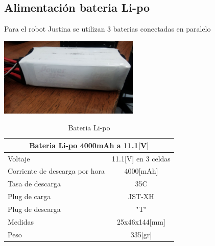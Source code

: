 \documentclass[a4paper,usenames,dvipsnames,svgnames,table]{book}
\begin{document}
\subsection{Alimentación bateria Li-po}

Para el robot Justina se utilizan 3 baterias conectadas en paralelo

\begin{center}
\includegraphics[width=0.5\textwidth]{Figures/Hardware/Partes/Li-po_Battery.jpg}
\label{fig:Hardware:Partes:Battery}
\end{center}

\begin{table}[H]
\begin{center}
\begin{tabular}{|l|l|}%

\hline
\multicolumn{2}{|c|}{Bateria Li-po 4000mAh a 11.1[V]} \\ \hline %
Voltaje &  \multicolumn{1}{|c|}{11.1[V] en 3 celdas}\\ \hline
Corriente de descarga por hora  & \multicolumn{1}{|c|}{4000[mAh]}\\ \hline
Tasa de descarga & \multicolumn{1}{|c|}{35C}\\ \hline
Plug de carga & \multicolumn{1}{|c|}{JST-XH}\\ \hline
Plug de descarga & \multicolumn{1}{|c|}{"T"}\\ \hline
Medidas & \multicolumn{1}{|c|}{25x46x144[mm]}\\ \hline
Peso & \multicolumn{1}{|c|}{335[gr]}\\ \hline

\end{tabular}
\caption{Bateria Li-po}
\label{Battery}
\end{center}
\end{table}
\end{document}
